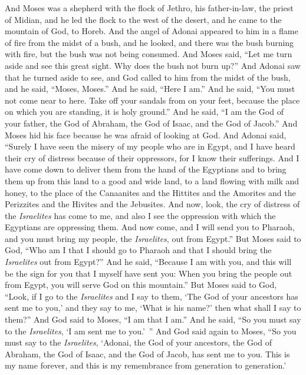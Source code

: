 \begin{biblechapter} %
 And Moses was a shepherd with the flock of Jethro, his father-in-law, the priest of Midian, and he led the flock to the west of the desert, and he came to the mountain of God, to Horeb.
\verse And the angel of Adonai appeared to him in a flame of fire from the midst of a bush, and he looked, and there was the bush burning with fire, but the bush was not being consumed.
\verse And Moses said, “Let me turn aside and see this great sight. Why does the bush not burn up?”
\verse And Adonai saw that he turned aside to see, and God called to him from the midst of the bush, and he said, “Moses, Moses.” And he said, “Here I am.”
\verse And he said, “You must not come near to here. Take off your sandals from on your feet, because the place on which you are standing, it is holy ground.”
\verse And he said, “I am the God of your father, the God of Abraham, the God of Isaac, and the God of Jacob.” And Moses hid his face because he was afraid of looking at God.
\verse And Adonai said, “Surely I have seen the misery of my people who are in Egypt, and I have heard their cry of distress because of their oppressors, for I know their sufferings.
\verse And I have come down to deliver them from the hand of the Egyptians and to bring them up from this land to a good and wide land, to a land flowing with milk and honey, to the place of the Canaanites and the Hittites and the Amorites and the Perizzites and the Hivites and the Jebusites.
\verse And now, look, the cry of distress of the \textit{Israelites} has come to me, and also I see the oppression with which the Egyptians are oppressing them.
\verse And now come, and I will send you to Pharaoh, and you must bring my people, the \textit{Israelites}, out from Egypt.”
\verse But Moses said to God, “Who am I that I should go to Pharaoh and that I should bring the \textit{Israelites} out from Egypt?”
\verse And he said, “Because I am with you, and this will be the sign for you that I myself have sent you: When you bring the people out from Egypt, you will serve God on this mountain.”
\verse But Moses said to God, “Look, if I go to the \textit{Israelites} and I say to them, ‘The God of your ancestors has sent me to you,’ and they say to me, ‘What is his name?’ then what shall I say to them?”
\verse And God said to Moses, “I am that I am.” And he said, “So you must say to the \textit{Israelites}, ‘I am sent me to you.’ ”
\verse And God said again to Moses, “So you must say to the \textit{Israelites}, ‘Adonai, the God of your ancestors, the God of Abraham, the God of Isaac, and the God of Jacob, has sent me to you. This is my name forever, and this is my remembrance from generation to generation.’

\end{biblechapter}
